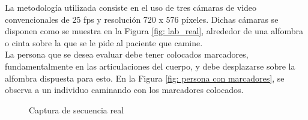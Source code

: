 La metodología utilizada consiste en el uso de tres cámaras de video convencionales de 25 fps y resolución  720 x 576 píxeles. Dichas cámaras se disponen como se muestra en la Figura \ref{fig: lab_real}, alrededor de una alfombra o cinta sobre la que se le pide al paciente que camine.\\



La persona que se desea evaluar debe tener colocados marcadores, fundamentalmente en las articulaciones del cuerpo, y debe desplazarse sobre la alfombra dispuesta para esto. En la Figura \ref{fig: persona con marcadores}, se observa a un individuo caminando con los marcadores colocados.

\vspace{-0.2cm}
\begin{figure}[ht!]		
        \hspace{0.1cm}
  \caption{Captura de secuencia real}
      \label{fig: captura real}
\end{figure}

